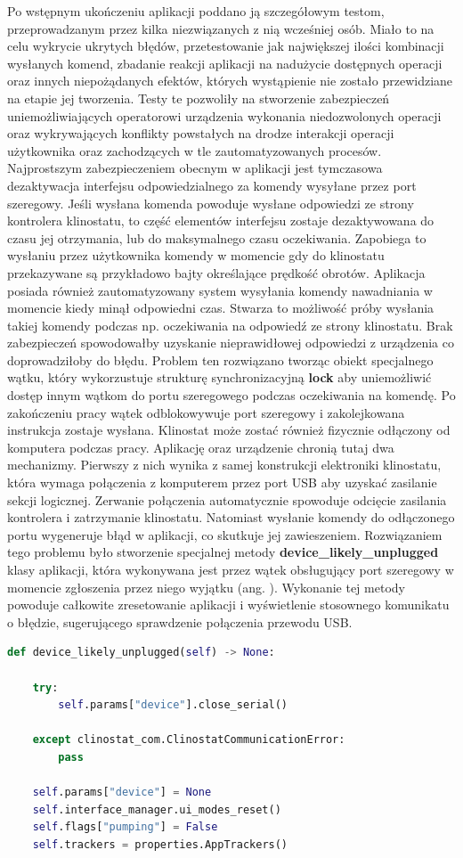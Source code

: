 Po wstępnym ukończeniu aplikacji poddano ją szczegółowym testom, przeprowadzanym przez kilka niezwiązanych z nią wcześniej osób. Miało to na celu wykrycie ukrytych błędów, przetestowanie jak największej ilości kombinacji wysłanych komend, zbadanie reakcji aplikacji na nadużycie dostępnych operacji oraz innych niepożądanych efektów, których wystąpienie nie zostało przewidziane na etapie jej tworzenia. Testy te pozwoliły na stworzenie zabezpieczeń uniemożliwiających operatorowi urządzenia wykonania niedozwolonych operacji oraz wykrywających konflikty powstałych na drodze interakcji operacji użytkownika oraz zachodzących w tle zautomatyzowanych procesów. Najprostszym zabezpieczeniem obecnym w aplikacji jest tymczasowa dezaktywacja interfejsu odpowiedzialnego za komendy wysyłane przez port szeregowy. Jeśli wysłana komenda powoduje wysłane odpowiedzi ze strony kontrolera klinostatu, to część elementów interfejsu zostaje dezaktywowana do czasu jej otrzymania, lub do maksymalnego czasu oczekiwania. Zapobiega to wysłaniu przez użytkownika komendy w momencie gdy do klinostatu przekazywane są przykładowo bajty określające prędkość obrotów. Aplikacja posiada również zautomatyzowany system wysyłania komendy nawadniania w momencie kiedy minął odpowiedni czas. Stwarza to możliwość próby wysłania takiej komendy podczas np. oczekiwania na odpowiedź ze strony klinostatu. Brak zabezpieczeń spowodowałby uzyskanie nieprawidłowej odpowiedzi z urządzenia co doprowadziłoby do błędu. Problem ten rozwiązano tworząc obiekt specjalnego wątku, który wykorzustuje strukturę synchronizacyjną \textbf{lock} aby uniemożliwić dostęp innym wątkom do portu szeregowego podczas oczekiwania na komendę. Po zakończeniu pracy wątek odblokowywuje port szeregowy i zakolejkowana instrukcja zostaje wysłana. Klinostat może zostać również fizycznie odłączony od komputera podczas pracy. Aplikację oraz urządzenie chronią tutaj dwa mechanizmy. Pierwszy z nich wynika z samej konstrukcji elektroniki klinostatu, która wymaga połączenia z komputerem przez port USB aby uzyskać zasilanie sekcji logicznej. Zerwanie połączenia automatycznie spowoduje odcięcie zasilania kontrolera i zatrzymanie klinostatu. Natomiast wysłanie komendy do odłączonego portu wygeneruje błąd w aplikacji, co skutkuje jej zawieszeniem. Rozwiązaniem tego problemu było stworzenie specjalnej metody \textbf{device\_likely\_unplugged} klasy aplikacji, która wykonywana jest przez wątek obsługujący port szeregowy w momencie zgłoszenia przez niego wyjątku (ang. ). Wykonanie tej metody powoduje całkowite zresetowanie aplikacji i wyświetlenie stosownego komunikatu o błędzie, sugerującego sprawdzenie połączenia przewodu USB.
\begin{lstlisting}[language=Python,caption={Metoda wykrywająca odłączone urządzenie.}]
def device_likely_unplugged(self) -> None:

	try:
		self.params["device"].close_serial()
		
	except clinostat_com.ClinostatCommunicationError:
		pass
		
	self.params["device"] = None
	self.interface_manager.ui_modes_reset()
	self.flags["pumping"] = False
	self.trackers = properties.AppTrackers()
\end{lstlisting}